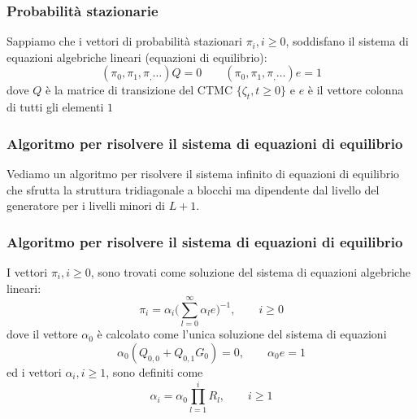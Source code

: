 \documentclass{beamer}
\begin{document}
\begin{frame}
    \frametitle{Probabilità stazionarie}
    Sappiamo che i vettori di probabilità stazionari $\pi_i, i \geq 0$, soddisfano il sistema di equazioni algebriche lineari (equazioni di equilibrio):
    $$(\pi_0, \pi_1, \pi_, \dots)Q = 0 \qquad (\pi_0, \pi_1, \pi_, \dots)e = 1$$
    dove $Q$ è la matrice di transizione del CTMC $\{\zeta_t, t \geq 0\}$ e $e$ è il vettore colonna di tutti gli elementi $1$
\end{frame}


\begin{frame}
    \frametitle{Algoritmo per risolvere il sistema di equazioni di equilibrio}
    \begin{block}{}
            Vediamo un algoritmo per risolvere il sistema infinito di equazioni di equilibrio che sfrutta la struttura tridiagonale a blocchi ma dipendente dal livello del generatore per i livelli minori di $L + 1$.
    \end{block}
\end{frame}


\begin{frame}
    \frametitle{Algoritmo per risolvere il sistema di equazioni di equilibrio}
    \begin{theorem}
        I vettori $\pi_i, i \geq 0$, sono trovati come soluzione del sistema di equazioni algebriche lineari:
        \small{\begin{equation*}
            \pi_i = \alpha_i \big( \sum_{l=0}^\infty \alpha_l e \big)^{-1}, \qquad i \geq 0
        \end{equation*}}
        dove il vettore $\alpha_0$ è calcolato come l'unica soluzione del sistema di equazioni
        \small{\begin{equation*}
            \alpha_0(Q_{0,0} + Q_{0,1}G_0) = 0, \qquad \alpha_0e = 1
        \end{equation*}}
        ed i vettori $\alpha_i, i \geq 1$, sono definiti come
        \small{\begin{equation*}
            \alpha_i = \alpha_0 \prod_{l=1}^i R_l, \qquad i \geq 1
        \end{equation*}}
    \end{theorem}
\end{frame}
\end{document}
